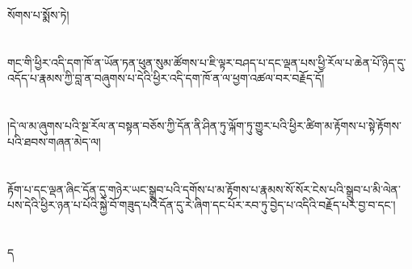 སོགས་པ་སྨོས་ཏེ།\chapter{ }གང་གི་ཕྱིར་འདི་དག་ཁོ་ན་ཡོན་ཏན་ཕུན་སུམ་ཚོགས་པ་ཇི་ལྟར་བཤད་པ་དང་ལྡན་པས་ཕྱི་རོལ་པ་ཆེན་པོ་ཉིད་དུ་འདོད་པ་རྣམས་ཀྱི་བླ་ན་བཞུགས་པ་དེའི་ཕྱིར་འདི་དག་ཁོ་ན་ལ་ཕྱག་འཚལ་བར་བརྗོད་དོ།\chapter{ }།དེ་ལ་མ་ཞུགས་པའི་སྔ་རོལ་ན་བསྟན་བཅོས་ཀྱི་དོན་ནི་ཤིན་ཏུ་ལྐོག་ཏུ་གྱུར་པའི་ཕྱིར་ཚིག་མ་རྟོགས་པ་སྟེ་རྟོགས་པའི་ཐབས་གཞན་མེད་ལ།\chapter{ }རྟོག་པ་དང་ལྡན་ཞིང་དོན་དུ་གཉེར་ཡང་སྒྲུབ་པའི་དགོས་པ་མ་རྟོགས་པ་རྣམས་སོ་སོར་ངེས་པའི་སྒྲུབ་པ་མི་ལེན་པས་དེའི་ཕྱིར་ཉན་པ་པོའི་སྐྱེ་བོ་གཟུད་པའི་དོན་དུ་རེ་ཞིག་དང་པོར་རབ་ཏུ་བྱེད་པ་འདིའི་བརྗོད་པར་བྱ་བ་དང་།\chapter{ }ད